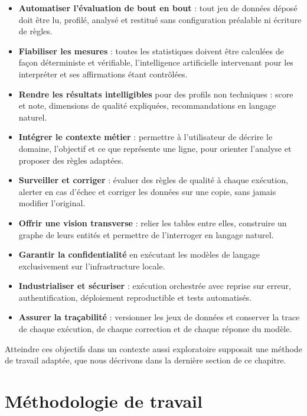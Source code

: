 \begin{itemize}
  \item \textbf{Automatiser l'évaluation de bout en bout} : tout jeu de données déposé doit être lu, profilé, analysé et restitué sans configuration préalable ni écriture de règles.
  \item \textbf{Fiabiliser les mesures} : toutes les statistiques doivent être calculées de façon déterministe et vérifiable, l'intelligence artificielle intervenant pour les interpréter et ses affirmations étant contrôlées.
  \item \textbf{Rendre les résultats intelligibles} pour des profils non techniques : score et note, dimensions de qualité expliquées, recommandations en langage naturel.
  \item \textbf{Intégrer le contexte métier} : permettre à l'utilisateur de décrire le domaine, l'objectif et ce que représente une ligne, pour orienter l'analyse et proposer des règles adaptées.
  \item \textbf{Surveiller et corriger} : évaluer des règles de qualité à chaque exécution, alerter en cas d'échec et corriger les données sur une copie, sans jamais modifier l'original.
  \item \textbf{Offrir une vision transverse} : relier les tables entre elles, construire un graphe de leurs entités et permettre de l'interroger en langage naturel.
  \item \textbf{Garantir la confidentialité} en exécutant les modèles de langage exclusivement sur l'infrastructure locale.
  \item \textbf{Industrialiser et sécuriser} : exécution orchestrée avec reprise sur erreur, authentification, déploiement reproductible et tests automatisés.
  \item \textbf{Assurer la traçabilité} : versionner les jeux de données et conserver la trace de chaque exécution, de chaque correction et de chaque réponse du modèle.
\end{itemize}

Atteindre ces objectifs dans un contexte aussi exploratoire supposait une méthode de travail adaptée, que nous décrivons dans la dernière section de ce chapitre.

\section{Méthodologie de travail}

